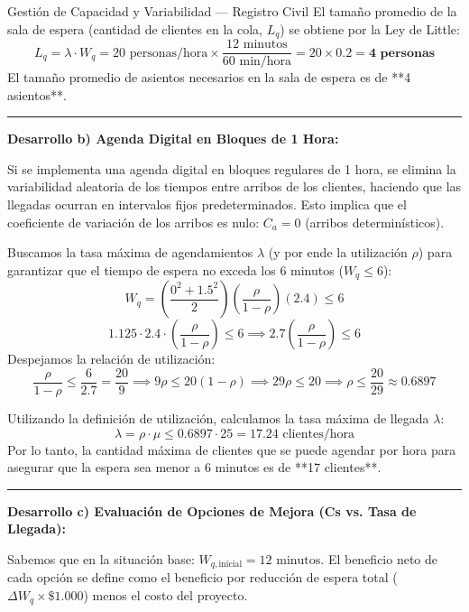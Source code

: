 \documentclass[11pt, a4paper]{article}
\begin{document}
\begin{ejercicio}{Gestión de Capacidad y Variabilidad --- Registro Civil}
  El tamaño promedio de la sala de espera (cantidad de clientes en la cola, $L_q$) se obtiene por la Ley de Little:
  \[
    L_q = \lambda \cdot W_q = 20 \text{ personas/hora} \times \frac{12 \text{ minutos}}{60 \text{ min/hora}} = 20 \times 0.2 = \mathbf{4 \text{ personas}}
  \]
  El tamaño promedio de asientos necesarios en la sala de espera es de **4 asientos**.

  \rule{\textwidth}{0.2pt}

  \textbf{Desarrollo b) Agenda Digital en Bloques de 1 Hora:}

  Si se implementa una agenda digital en bloques regulares de 1 hora, se elimina la variabilidad aleatoria de los tiempos entre arribos de los clientes, haciendo que las llegadas ocurran en intervalos fijos predeterminados. Esto implica que el coeficiente de variación de los arribos es nulo: $C_a = 0$ (arribos determinísticos).

  Buscamos la tasa máxima de agendamientos $\lambda$ (y por ende la utilización $\rho$) para garantizar que el tiempo de espera no exceda los 6 minutos ($W_q \le 6$):
  \[
    W_q = \left( \frac{0^2 + 1.5^2}{2} \right) \left( \frac{\rho}{1 - \rho} \right) \left( 2.4 \right) \le 6
  \]
  \[
    1.125 \cdot 2.4 \cdot \left( \frac{\rho}{1 - \rho} \right) \le 6 \implies 2.7 \left( \frac{\rho}{1 - \rho} \right) \le 6
  \]
  Despejamos la relación de utilización:
  \[
    \frac{\rho}{1 - \rho} \le \frac{6}{2.7} = \frac{20}{9} \implies 9\rho \le 20(1-\rho) \implies 29\rho \le 20 \implies \rho \le \frac{20}{29} \approx 0.6897
  \]

  Utilizando la definición de utilización, calculamos la tasa máxima de llegada $\lambda$:
  \[
    \lambda = \rho \cdot \mu \le 0.6897 \cdot 25 = 17.24 \text{ clientes/hora}
  \]
  Por lo tanto, la cantidad máxima de clientes que se puede agendar por hora para asegurar que la espera sea menor a 6 minutos es de **17 clientes**.

  \rule{\textwidth}{0.2pt}

  \textbf{Desarrollo c) Evaluación de Opciones de Mejora (Cs vs. Tasa de Llegada):}

  Sabemos que en la situación base: $W_{q,\text{inicial}} = 12 \text{ minutos}$.
  El beneficio neto de cada opción se define como el beneficio por reducción de espera total ($\Delta W_q \times \$1.000$) menos el costo del proyecto.


\end{ejercicio}
\end{document}
